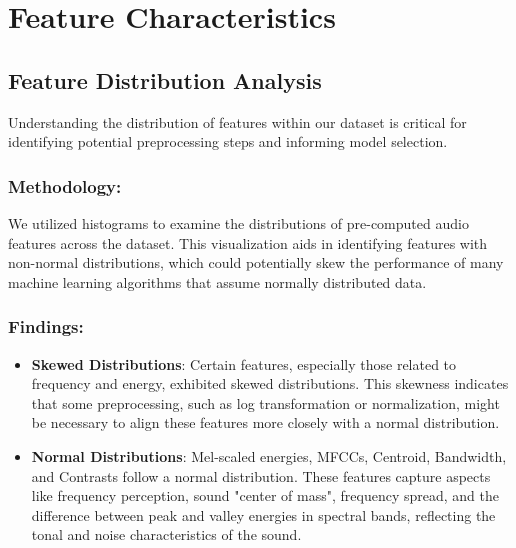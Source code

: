 \section{Feature Characteristics}

\subsection{Feature Distribution Analysis}

Understanding the distribution of features within our dataset is critical for identifying potential preprocessing steps and informing model selection.

\subsubsection{Methodology:}

We utilized histograms to examine the distributions of pre-computed audio features across the dataset. This visualization aids in identifying features with non-normal distributions, which could potentially skew the performance of many machine learning algorithms that assume normally distributed data.

\subsubsection{Findings:}

\begin{itemize}
    \item \textbf{Skewed Distributions}: Certain features, especially those related to frequency and energy, exhibited skewed distributions. This skewness indicates that some preprocessing, such as log transformation or normalization, might be necessary to align these features more closely with a normal distribution.
    \item \textbf{Normal Distributions}: Mel-scaled energies, MFCCs, Centroid, Bandwidth, and Contrasts follow a normal distribution. These features capture aspects like frequency perception, sound "center of mass", frequency spread, and the difference between peak and valley energies in spectral bands, reflecting the tonal and noise characteristics of the sound.
\end{itemize}

